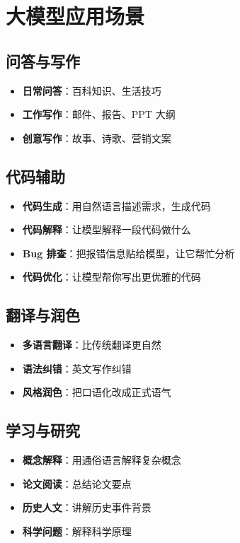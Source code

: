 \documentclass[12pt,UTF8]{ctexbook}
\begin{document}
\chapter{大模型应用场景}

\section{问答与写作}

\begin{itemize}
  \item \textbf{日常问答}：百科知识、生活技巧
  \item \textbf{工作写作}：邮件、报告、PPT 大纲
  \item \textbf{创意写作}：故事、诗歌、营销文案
\end{itemize}

\section{代码辅助}

\begin{itemize}
  \item \textbf{代码生成}：用自然语言描述需求，生成代码
  \item \textbf{代码解释}：让模型解释一段代码做什么
  \item \textbf{Bug 排查}：把报错信息贴给模型，让它帮忙分析
  \item \textbf{代码优化}：让模型帮你写出更优雅的代码
\end{itemize}

\section{翻译与润色}

\begin{itemize}
  \item \textbf{多语言翻译}：比传统翻译更自然
  \item \textbf{语法纠错}：英文写作纠错
  \item \textbf{风格润色}：把口语化改成正式语气
\end{itemize}

\section{学习与研究}

\begin{itemize}
  \item \textbf{概念解释}：用通俗语言解释复杂概念
  \item \textbf{论文阅读}：总结论文要点
  \item \textbf{历史人文}：讲解历史事件背景
  \item \textbf{科学问题}：解释科学原理
\end{itemize}
\end{document}
